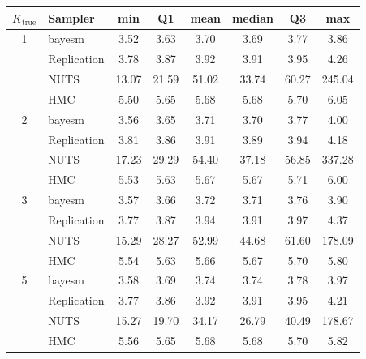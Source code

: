 \begin{tabular}{clcccccc}
\toprule
$K_{\text{true}}$ & Sampler & min & Q1 & mean & median & Q3 & max \\
\midrule
1 & bayesm & 3.52 & 3.63 & 3.70 & 3.69 & 3.77 & 3.86 \\
 & Replication & 3.78 & 3.87 & 3.92 & 3.91 & 3.95 & 4.26 \\
 & NUTS & 13.07 & 21.59 & 51.02 & 33.74 & 60.27 & 245.04 \\
 & HMC & 5.50 & 5.65 & 5.68 & 5.68 & 5.70 & 6.05 \\
2 & bayesm & 3.56 & 3.65 & 3.71 & 3.70 & 3.77 & 4.00 \\
 & Replication & 3.81 & 3.86 & 3.91 & 3.89 & 3.94 & 4.18 \\
 & NUTS & 17.23 & 29.29 & 54.40 & 37.18 & 56.85 & 337.28 \\
 & HMC & 5.53 & 5.63 & 5.67 & 5.67 & 5.71 & 6.00 \\
3 & bayesm & 3.57 & 3.66 & 3.72 & 3.71 & 3.76 & 3.90 \\
 & Replication & 3.77 & 3.87 & 3.94 & 3.91 & 3.97 & 4.37 \\
 & NUTS & 15.29 & 28.27 & 52.99 & 44.68 & 61.60 & 178.09 \\
 & HMC & 5.54 & 5.63 & 5.66 & 5.67 & 5.70 & 5.80 \\
5 & bayesm & 3.58 & 3.69 & 3.74 & 3.74 & 3.78 & 3.97 \\
 & Replication & 3.77 & 3.86 & 3.92 & 3.91 & 3.95 & 4.21 \\
 & NUTS & 15.27 & 19.70 & 34.17 & 26.79 & 40.49 & 178.67 \\
 & HMC & 5.56 & 5.65 & 5.68 & 5.68 & 5.70 & 5.82 \\
\bottomrule
\end{tabular}
